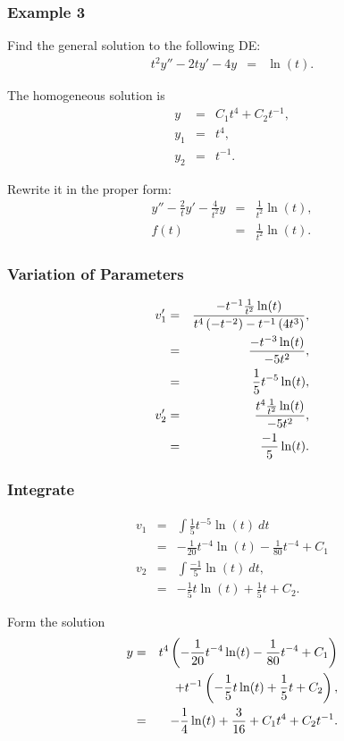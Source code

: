 \begin{frame}
  \frametitle{Example 3}
  Find the general solution to the following DE:
  \begin{eqnarray*}
    t^2 y'' - 2t y' - 4y & = & \ln(t).
  \end{eqnarray*}

  {

    The homogeneous solution is
    \begin{eqnarray*}
      y & = & C_1 t^4 + C_2 t^{-1}, \\
      y_1 & = & t^4, \\
      y_2 & = & t^{-1}.
    \end{eqnarray*}

    Rewrite it in the proper form:
    \begin{eqnarray*}
      y'' - \frac{2}{t} y' - \frac{4}{t^2} y& = & \frac{1}{t^2} \ln(t), \\
      f(t) & = & \frac{1}{t^2} \ln(t).
    \end{eqnarray*}

  }
\end{frame}

\begin{frame}
  \frametitle{Variation of Parameters}

  \begin{eqnarray*}
    v_1' & = & \frac{-t^{-1}\frac{1}{t^2}\ln(t)}{t^4 \left( -t^{-2} \right) - t^{-1} \left( 4 t^3 \right)}, \\
    & = & \frac{-t^{-3}\ln(t)}{-5t^2}, \\
    & = & \frac{1}{5} t^{-5} \ln(t), \\
    v_2' & = & \frac{t^4 \frac{1}{t^2} \ln(t)}{-5t^2}, \\
    & = & \frac{-1}{5} \ln(t).
  \end{eqnarray*}


\end{frame}

\begin{frame}
  \frametitle{Integrate}

  \begin{eqnarray*}
    v_1 & = & \int \frac{1}{5} t^{-5} \ln(t) ~ dt  \\
    & = & -\frac{1}{20} t^{-4} \ln(t) - \frac{1}{80} t^{-4} + C_1 \\
    v_2 & = & \int \frac{-1}{5} \ln(t) ~ dt, \\
    & = & -\frac{1}{5} t \ln(t) + \frac{1}{5} t + C_2.
  \end{eqnarray*}

  Form the solution
  \begin{eqnarray*}
    y & = & t^4 \left( -\frac{1}{20} t^{-4} \ln(t) - \frac{1}{80} t^{-4} + C_1 \right) \\
    & & + t^{-1} \left( -\frac{1}{5} t \ln(t) + \frac{1}{5} t + C_2 \right), \\
    & = & -\frac{1}{4} \ln(t) + \frac{3}{16} + C_1 t^4 + C_2 t^{-1}.
  \end{eqnarray*}

\end{frame}


